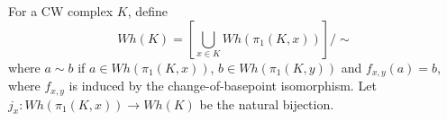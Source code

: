For a CW complex $K$, define
$$Wh(K) = \left[ \bigcup_{x \in K} Wh(\pi_1(K, x)) \right] / \sim$$
where $a \sim b$ if $a \in Wh(\pi_1(K, x))$, $b \in Wh(\pi_1(K, y))$ and $f_{x,y}(a) = b$, where $f_{x,y}$ is induced by the change-of-basepoint isomorphism. Let $j_x: Wh(\pi_1(K, x)) \rightarrow Wh(K)$ be the natural bijection.
